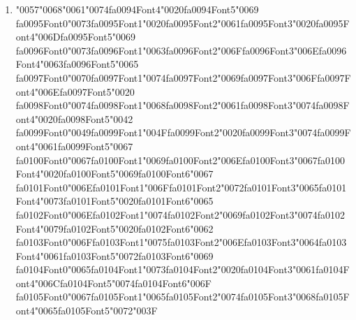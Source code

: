 \documentclass[11pt]{article}
\begin{document}
\begin{enumerate}[leftmargin=*]
  \item {\char"0057}{\char"0068}{\char"0061}{\char"0074}{\csname fa0094Font4\endcsname\char"0020}{\csname fa0094Font5\endcsname\char"0069} {\csname fa0095Font0\endcsname\char"0073}{\csname fa0095Font1\endcsname\char"0020}{\csname fa0095Font2\endcsname\char"0061}{\csname fa0095Font3\endcsname\char"0020}{\csname fa0095Font4\endcsname\char"006D}{\csname fa0095Font5\endcsname\char"0069} {\csname fa0096Font0\endcsname\char"0073}{\csname fa0096Font1\endcsname\char"0063}{\csname fa0096Font2\endcsname\char"006F}{\csname fa0096Font3\endcsname\char"006E}{\csname fa0096Font4\endcsname\char"0063}{\csname fa0096Font5\endcsname\char"0065} {\csname fa0097Font0\endcsname\char"0070}{\csname fa0097Font1\endcsname\char"0074}{\csname fa0097Font2\endcsname\char"0069}{\csname fa0097Font3\endcsname\char"006F}{\csname fa0097Font4\endcsname\char"006E}{\csname fa0097Font5\endcsname\char"0020} {\csname fa0098Font0\endcsname\char"0074}{\csname fa0098Font1\endcsname\char"0068}{\csname fa0098Font2\endcsname\char"0061}{\csname fa0098Font3\endcsname\char"0074}{\csname fa0098Font4\endcsname\char"0020}{\csname fa0098Font5\endcsname\char"0042} {\csname fa0099Font0\endcsname\char"0049}{\csname fa0099Font1\endcsname\char"004F}{\csname fa0099Font2\endcsname\char"0020}{\csname fa0099Font3\endcsname\char"0074}{\csname fa0099Font4\endcsname\char"0061}{\csname fa0099Font5\endcsname\char"0067} {\csname fa0100Font0\endcsname\char"0067}{\csname fa0100Font1\endcsname\char"0069}{\csname fa0100Font2\endcsname\char"006E}{\csname fa0100Font3\endcsname\char"0067}{\csname fa0100Font4\endcsname\char"0020}{\csname fa0100Font5\endcsname\char"0069}{\csname fa0100Font6\endcsname\char"0067} {\csname fa0101Font0\endcsname\char"006E}{\csname fa0101Font1\endcsname\char"006F}{\csname fa0101Font2\endcsname\char"0072}{\csname fa0101Font3\endcsname\char"0065}{\csname fa0101Font4\endcsname\char"0073}{\csname fa0101Font5\endcsname\char"0020}{\csname fa0101Font6\endcsname\char"0065} {\csname fa0102Font0\endcsname\char"006E}{\csname fa0102Font1\endcsname\char"0074}{\csname fa0102Font2\endcsname\char"0069}{\csname fa0102Font3\endcsname\char"0074}{\csname fa0102Font4\endcsname\char"0079}{\csname fa0102Font5\endcsname\char"0020}{\csname fa0102Font6\endcsname\char"0062} {\csname fa0103Font0\endcsname\char"006F}{\csname fa0103Font1\endcsname\char"0075}{\csname fa0103Font2\endcsname\char"006E}{\csname fa0103Font3\endcsname\char"0064}{\csname fa0103Font4\endcsname\char"0061}{\csname fa0103Font5\endcsname\char"0072}{\csname fa0103Font6\endcsname\char"0069} {\csname fa0104Font0\endcsname\char"0065}{\csname fa0104Font1\endcsname\char"0073}{\csname fa0104Font2\endcsname\char"0020}{\csname fa0104Font3\endcsname\char"0061}{\csname fa0104Font4\endcsname\char"006C}{\csname fa0104Font5\endcsname\char"0074}{\csname fa0104Font6\endcsname\char"006F} {\csname fa0105Font0\endcsname\char"0067}{\csname fa0105Font1\endcsname\char"0065}{\csname fa0105Font2\endcsname\char"0074}{\csname fa0105Font3\endcsname\char"0068}{\csname fa0105Font4\endcsname\char"0065}{\csname fa0105Font5\endcsname\char"0072}{\char"003F}

\end{enumerate}
\end{document}
